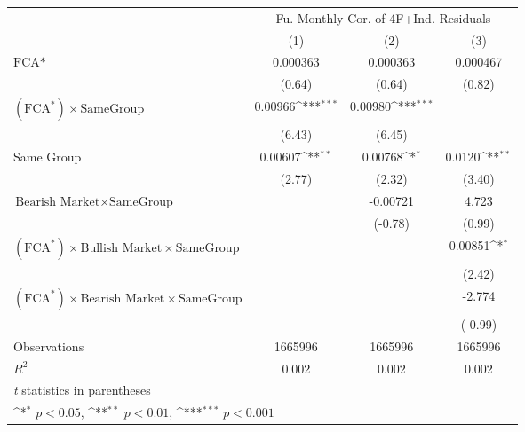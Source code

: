 {
\def\sym#1{\ifmmode^{#1}\else\(^{#1}\)\fi}
\begin{tabular}{l*{3}{c}}
\hline\hline
                &\multicolumn{3}{c}{Fu. Monthly Cor. of 4F+Ind. Residuals}\\\cmidrule(lr){2-4}
                &\multicolumn{1}{c}{(1)}         &\multicolumn{1}{c}{(2)}         &\multicolumn{1}{c}{(3)}         \\
\hline
$ \text{FCA*} $ & 0.000363         & 0.000363         & 0.000467         \\
                &   (0.64)         &   (0.64)         &   (0.82)         \\
[1em]
 $ (\text{FCA}^*) \times {\text{SameGroup} }  $ &  0.00966\sym{***}&  0.00980\sym{***}&                  \\
                &   (6.43)         &   (6.45)         &                  \\
[1em]
Same Group      &  0.00607\sym{**} &  0.00768\sym{*}  &   0.0120\sym{**} \\
                &   (2.77)         &   (2.32)         &   (3.40)         \\
[1em]
$ {\text{Bearish Market} } \times {\text{SameGroup} }  $ &                  & -0.00721         &    4.723         \\
                &                  &  (-0.78)         &   (0.99)         \\
[1em]
$ (\text{FCA}^*) \times {\text{Bullish Market}} \times {\text{SameGroup} }  $ &                  &                  &  0.00851\sym{*}  \\
                &                  &                  &   (2.42)         \\
[1em]
$ (\text{FCA}^*) \times {\text{Bearish Market}} \times {\text{SameGroup} }  $ &                  &                  &   -2.774         \\
                &                  &                  &  (-0.99)         \\
\hline
Observations    &  1665996         &  1665996         &  1665996         \\
\(R^{2}\)       &    0.002         &    0.002         &    0.002         \\
\hline\hline
\multicolumn{4}{l}{\footnotesize \textit{t} statistics in parentheses}\\
\multicolumn{4}{l}{\footnotesize \sym{*} \(p<0.05\), \sym{**} \(p<0.01\), \sym{***} \(p<0.001\)}\\
\end{tabular}
}
